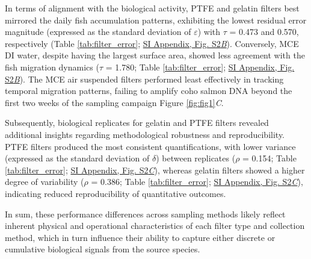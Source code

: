 \documentclass{article}
\begin{document}
In terms of alignment with the biological activity, PTFE and gelatin filters best mirrored the daily fish accumulation patterns, exhibiting the lowest residual error magnitude (expressed as the standard deviation of $\varepsilon$) with $\tau$ = 0.473 and 0.570, respectively (Table \ref{tab:filter_error}; \href{SI_Appendix.pdf}{SI Appendix, Fig. S2\textit{B}}). Conversely, MCE DI water, despite having the largest surface area, showed less agreement with the fish migration dynamics ($\tau$ = 1.780; Table \ref{tab:filter_error}; \href{SI_Appendix.pdf}{SI Appendix, Fig. S2\textit{B}}). The MCE air suspended filters performed least effectively in tracking temporal migration patterns, failing to amplify coho salmon DNA beyond the first two weeks of the sampling campaign Figure \ref{fig:fig1}\textit{C}.

Subsequently, biological replicates for gelatin and PTFE filters revealed additional insights regarding methodological robustness and reproducibility. PTFE filters produced the most consistent quantifications, with lower variance (expressed as the standard deviation of $\delta$) between replicates ($\rho$ = 0.154; Table \ref{tab:filter_error}; \href{SI_Appendix.pdf}{SI Appendix, Fig. S2\textit{C}}), whereas gelatin filters showed a higher degree of variability ($\rho$ = 0.386; Table \ref{tab:filter_error}; \href{SI_Appendix.pdf}{SI Appendix, Fig. S2\textit{C}}), indicating reduced reproducibility of quantitative outcomes. 

In sum, these performance differences across sampling methods likely reflect inherent physical and operational characteristics of each filter type and collection method, which in turn influence their ability to capture either discrete or cumulative biological signals from the source species.
\end{document}

